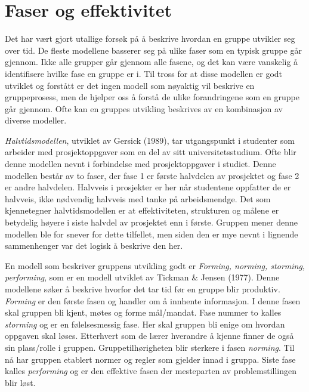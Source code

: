 \section{Faser og effektivitet}
Det har vært gjort utallige forsøk på å beskrive hvordan en gruppe utvikler seg over tid. 
De fleste modellene basserer seg på ulike faser som en typisk gruppe går gjennom. 
Ikke alle grupper går gjennom alle fasene, og det kan være vanskelig å identifisere hvilke fase en gruppe er i.
Til tross for at disse modellen er godt utviklet og forstått er det ingen modell som nøyaktig vil beskrive en gruppeprosess, men de hjelper oss å forstå de ulike forandringene som en gruppe går gjennom. 
Ofte kan en gruppes utvikling beskrives av en kombinasjon av diverse modeller. 
\vspace{\secspace}

\textit{Halvtidsmodellen}, utviklet av Gersick (1989), tar utgangspunkt i studenter som arbeider med prosjektoppgaver som en del av sitt universitetsstudium.
Ofte blir denne modellen nevnt i forbindelse med prosjektoppgaver i studiet. 
Denne modellen består av to faser, der fase 1 er første halvdelen av prosjektet og fase 2 er andre halvdelen. 
Halvveis i prosjekter er her når studentene oppfatter de er halvveis, ikke nødvendig halvveis med tanke på arbeidsmendge. 
Det som kjennetegner halvtidsmodellen er at effektiviteten, strukturen og målene er betydelig høyere i siste halvdel av prosjektet enn i første.
Gruppen mener denne modellen ble for snever for dette tilfellet, men siden den er mye nevnt i lignende sammenhenger var det logisk å beskrive den her. 
\vspace{\secspace}

En modell som beskriver gruppens utvikling godt er \textit{Forming, norming, storming, performing}, som er en modell utviklet av Tickman \& Jensen (1977). 
Denne modellene søker å beskrive hvorfor det tar tid før en gruppe blir produktiv. 
\textit{Forming} er den første fasen og handler om å innhente informasjon. 
I denne fasen skal gruppen bli kjent, møtes og forme mål/mandat.
Fase nummer to kalles \textit{storming} og er en følelsesmessig fase. 
Her skal gruppen bli enige om hvordan oppgaven skal løses. 
Etterhvert som de lærer hverandre å kjenne finner de også sin plass/rolle i gruppen. 
Gruppetilhørigheten blir sterkere i fasen \textit{norming}. 
Til nå har gruppen etablert normer og regler som gjelder innad i gruppa. 
Siste fase kalles \textit{performing} og er den effektive fasen der mesteparten av problemstillingen blir løst. 
\vspace{\secspace}

